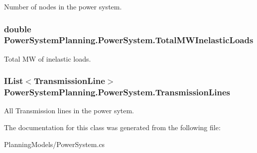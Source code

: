 Number of nodes in the power system. 

\subsubsection[{\texorpdfstring{Total\+M\+W\+Inelastic\+Loads}{TotalMWInelasticLoads}}]{\setlength{\rightskip}{0pt plus 5cm}double Power\+System\+Planning.\+Power\+System.\+Total\+M\+W\+Inelastic\+Loads\hspace{0.3cm}{\ttfamily [get]}}\hypertarget{class_power_system_planning_1_1_power_system_ade5099d2eb198a61bf794e14ce4b3018}{}\label{class_power_system_planning_1_1_power_system_ade5099d2eb198a61bf794e14ce4b3018}


Total MW of inelastic loads. 

\subsubsection[{\texorpdfstring{Transmission\+Lines}{TransmissionLines}}]{\setlength{\rightskip}{0pt plus 5cm}I\+List$<${\bf Transmission\+Line}$>$ Power\+System\+Planning.\+Power\+System.\+Transmission\+Lines\hspace{0.3cm}{\ttfamily [get]}}\hypertarget{class_power_system_planning_1_1_power_system_a8b2c36218174e515b9ab0ef34531435f}{}\label{class_power_system_planning_1_1_power_system_a8b2c36218174e515b9ab0ef34531435f}


All Transmission lines in the power sytem. 



The documentation for this class was generated from the following file\+:\begin{DoxyCompactItemize}
\item 
Planning\+Models/Power\+System.\+cs\end{DoxyCompactItemize}
